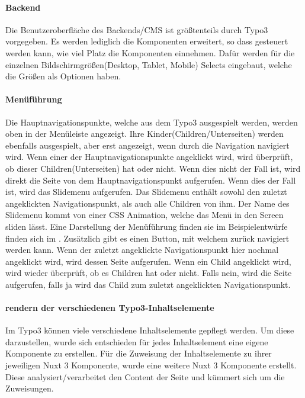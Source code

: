 \paragraph{Backend} 
\linebreak 
Die Benutzeroberfläche des Backends/CMS ist größtenteils durch Typo3 vorgegeben. Es werden lediglich die Komponenten erweitert, so dass gesteuert werden kann, wie viel Platz die Komponenten einnehmen. Dafür werden für die einzelnen Bildschirmgrößen(Desktop, Tablet, Mobile) Selects eingebaut, welche die Größen als Optionen haben.

\paragraph{Menüführung}  
\linebreak
Die Hauptnavigationspunkte, welche aus dem Typo3 ausgespielt werden, werden oben in der Menüleiste angezeigt. Ihre Kinder(Children/Unterseiten) werden ebenfalls ausgespielt, aber erst angezeigt, wenn durch die Navigation navigiert wird. Wenn einer der Hauptnavigationspunkte angeklickt wird, wird überprüft, ob dieser Children(Unterseiten) hat oder nicht. Wenn dies nicht der Fall ist, wird direkt die Seite von dem Hauptnavigationspunkt aufgerufen. Wenn dies der Fall ist, wird das Slidemenu aufgerufen. Das Slidemenu enthält sowohl den zuletzt angeklickten Navigationspunkt, als auch alle Children von ihm. Der Name des Slidemenu kommt von einer CSS Animation, welche das Menü in den Screen sliden lässt. Eine Darstellung der Menüführung finden sie im Beispielentwürfe finden sich im . Zusätzlich gibt es einen Button, mit welchem zurück navigiert werden kann. Wenn der zuletzt angeklickte Navigationspunkt hier nochmal angeklickt wird, wird dessen Seite aufgerufen. Wenn ein Child angeklickt wird, wird wieder überprüft, ob es Children hat oder nicht. Falls nein, wird die Seite aufgerufen, falls ja wird das Child zum zuletzt angeklickten Navigationspunkt. 

\paragraph{rendern der verschiedenen Typo3-Inhaltselemente}
Im Typo3 können viele verschiedene Inhaltselemente gepflegt werden. Um diese darzustellen, wurde sich entschieden für jedes Inhaltselement eine eigene Komponente zu erstellen. Für die Zuweisung der Inhaltselemente zu ihrer jeweiligen Nuxt 3 Komponente, wurde eine weitere Nuxt 3 Komponente erstellt. Diese analysiert/verarbeitet den Content der Seite und kümmert sich um die Zuweisungen.


